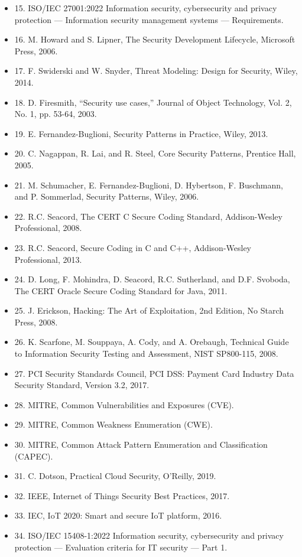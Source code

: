 \documentclass[uplatex,dvipdfmx,a4paper,11pt]{jsarticle}
\begin{document}
\begin{itemize}[leftmargin=2em]
\item 15. ISO/IEC 27001:2022 Information security, cybersecurity and privacy protection — Information security management systems — Requirements.
\item 16. M. Howard and S. Lipner, The Security Development Lifecycle, Microsoft Press, 2006.
\item 17. F. Swiderski and W. Snyder, Threat Modeling: Design for Security, Wiley, 2014.
\item 18. D. Firesmith, “Security use cases,” Journal of Object Technology, Vol. 2, No. 1, pp. 53-64, 2003.
\item 19. E. Fernandez-Buglioni, Security Patterns in Practice, Wiley, 2013.
\item 20. C. Nagappan, R. Lai, and R. Steel, Core Security Patterns, Prentice Hall, 2005.
\item 21. M. Schumacher, E. Fernandez-Buglioni, D. Hybertson, F. Buschmann, and P. Sommerlad, Security Patterns, Wiley, 2006.
\item 22. R.C. Seacord, The CERT C Secure Coding Standard, Addison-Wesley Professional, 2008.
\item 23. R.C. Seacord, Secure Coding in C and C++, Addison-Wesley Professional, 2013.
\item 24. D. Long, F. Mohindra, D. Seacord, R.C. Sutherland, and D.F. Svoboda, The CERT Oracle Secure Coding Standard for Java, 2011.
\item 25. J. Erickson, Hacking: The Art of Exploitation, 2nd Edition, No Starch Press, 2008.
\item 26. K. Scarfone, M. Souppaya, A. Cody, and A. Orebaugh, Technical Guide to Information Security Testing and Assessment, NIST SP800-115, 2008.
\item 27. PCI Security Standards Council, PCI DSS: Payment Card Industry Data Security Standard, Version 3.2, 2017.
\item 28. MITRE, Common Vulnerabilities and Exposures (CVE).
\item 29. MITRE, Common Weakness Enumeration (CWE).
\item 30. MITRE, Common Attack Pattern Enumeration and Classification (CAPEC).
\item 31. C. Dotson, Practical Cloud Security, O’Reilly, 2019.
\item 32. IEEE, Internet of Things Security Best Practices, 2017.
\item 33. IEC, IoT 2020: Smart and secure IoT platform, 2016.
\item 34. ISO/IEC 15408-1:2022 Information security, cybersecurity and privacy protection — Evaluation criteria for IT security — Part 1.

\end{itemize}
\end{document}
